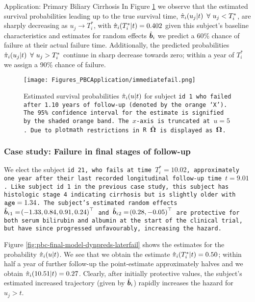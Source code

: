 \begin{chapter}{\label{cha:app-PBC}Application: Primary Biliary Cirrhosis}
  In Figure \ref{fig:pbc-final-model-dynpreds-immediatefail} we observe that the estimated survival probabilities leading up to the true survival time, $\hat{\pi}_i\lb u_j|t\rb\ \forall\ u_j<T_i^*$, are sharply decreasing as  $u_j\rightarrow T_i^*$, with $\hat{\pi}_i\lb T_i^*|t\rb=0.402$ \ie given this subject's baseline characteristics and estimates for random effects $\hb$ we predict a 60\% chance of failure at their actual failure time. Additionally, the predicted probabilities $\hat{\pi}_i\lb u_j|t\rb\ \forall\ u_j>T_i^*$ continue in sharp decrease towards zero; within a year of $T_i^*$ we assign a 90\% chance of failure.

  \begin{figure}[ht]
      \centering
      \texttt{[image: Figures\_PBCApplication/immediatefail.png]}
      \caption{Estimated survival probabilities $\hat{\pi}_i\lb u|t\rb$ for subject \tt{id} 1 who failed after 1.10 years of follow-up (denoted by the orange `X'). The 95\% confidence interval for the estimate is signified by the shaded orange band. The $x$-axis is truncated at $u=5$. Due to \tt{plotmath} restrictions in \tt{R} $\hbO$ is displayed as $\bO$.}
      \label{fig:pbc-final-model-dynpreds-immediatefail}
  \end{figure}

  \subsubsection{Case study: Failure in final stages of follow-up}
  We elect the subject \tt{id} 21, who fails at time $T_i^*=10.02$, approximately one year after their last recorded longitudinal follow-up time $t=9.01$. Like subject \tt{id} 1 in the previous case study, this subject has \tt{histologic} stage 4 indicating cirrhosis but is slightly older with $\tt{age}=1.34$. The subject's estimated random effects $\hb{_1}=\lb-1.33,0.84,0.91,0.24\rb^\top$ and $\hb{_2}=\lb0.28,-0.05\rb^\top$ are protective for both serum bilirubin and albumin at the start of the clinical trial, but have since progressed unfavourably, increasing the hazard.

  Figure \ref{fig:pbc-final-model-dynpreds-laterfail} shows the estimates for the probability $\hat{\pi}_i\lb u|t\rb$. We see that we obtain the estimate $\hat{\pi}_i\lb T_i^*|t\rb=0.50$; within half a year of further follow-up the point-estimate approximately halves and we obtain $\hat{\pi}_i\lb 10.51|t\rb=0.27$. Clearly, after initially protective values, the subject's estimated increased trajectory (given by $\hb$) rapidly increases the hazard for $u_j>t$.


\end{chapter}
